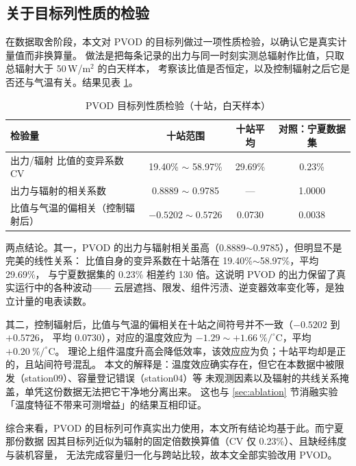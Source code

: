 \documentclass[11pt,a4paper]{ctexart}
\begin{document}
\subsection{关于目标列性质的检验}
\label{sec:targetcheck}

在数据取舍阶段，本文对 PVOD 的目标列做过一项性质检验，以确认它是真实计量值而非换算量。
做法是把每条记录的出力与同一时刻实测总辐射作比值，只取总辐射大于 50\,W/m$^2$ 的白天样本，
考察该比值是否恒定，以及控制辐射之后它是否还与气温有关。结果见表 \ref{tab:target}。

\begin{table}[htbp]
\centering
\caption{PVOD 目标列性质检验（十站，白天样本）}
\label{tab:target}
\begin{tabular}{lccc}
\toprule
检验量 & 十站范围 & 十站平均 & 对照：宁夏数据集 \\
\midrule
出力/辐射 比值的变异系数 CV & 19.40\% $\sim$ 58.97\% & 29.69\% & 0.23\% \\
出力与辐射的相关系数        & 0.8889 $\sim$ 0.9785   & ---     & 1.0000 \\
比值与气温的偏相关（控制辐射后） & $-0.5202 \sim 0.5726$ & 0.0730 & 0.0038 \\
\bottomrule
\end{tabular}
\end{table}

两点结论。其一，PVOD 的出力与辐射相关虽高（0.8889$\sim$0.9785），但明显不是完美的线性关系：
比值自身的变异系数在十站落在 19.40\%$\sim$58.97\%，平均 29.69\%，
与宁夏数据集的 0.23\% 相差约 130 倍。这说明 PVOD 的出力保留了真实运行中的各种波动——
云层遮挡、限发、组件污渍、逆变器效率变化等，是独立计量的电表读数。

其二，控制辐射后，比值与气温的偏相关在十站之间符号并不一致（$-0.5202$ 到 $+0.5726$，
平均 $0.0730$），对应的温度效应为 $-1.29 \sim +1.66\ \%/^{\circ}\mathrm{C}$，平均 $+0.20\ \%/^{\circ}\mathrm{C}$。
理论上组件温度升高会降低效率，该效应应为负；十站平均却是正的，且站间符号混乱。
本文的解释是：温度效应确实存在，但它在本数据中被限发（station09）、容量登记错误（station04）等
未观测因素以及辐射的共线关系掩盖，单凭这份数据无法把它干净地分离出来。
这也与 \ref{sec:ablation} 节消融实验「温度特征不带来可测增益」的结果互相印证。

综合来看，PVOD 的目标列可作真实出力使用，本文所有结论均基于此。而宁夏那份数据
因其目标列近似为辐射的固定倍数换算值（CV 仅 0.23\%）、且缺经纬度与装机容量，
无法完成容量归一化与跨站比较，故本文全部实验改用 PVOD。

\end{document}
